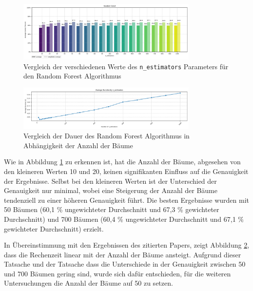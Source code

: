 \begin{figure}[H]
    \centering
    \includegraphics[width=0.8\textwidth]{images/04_random_forest_n_estimators_03.png}
    \caption{Vergleich der verschiedenen Werte des \texttt{n\_estimators} Parameters für den Random Forest Algorithmus}
    \label{fig:04_random_forest_n_estimators_03}
\end{figure}

\begin{figure}[H]
    \centering
    \includegraphics[width=0.8\textwidth]{images/04_random_forest_n_estimators_04.png}
    \caption{Vergleich der Dauer des Random Forest Algorithmus in Abhängigkeit der Anzahl der Bäume}
    \label{fig:04_random_forest_n_estimators_04}
\end{figure}

Wie in Abbildung \ref{fig:04_random_forest_n_estimators_03} zu erkennen ist, hat die Anzahl der Bäume, abgesehen von den kleineren Werten 10 und 20, keinen signifikanten Einfluss auf die Genauigkeit der Ergebnisse. Selbst bei den kleineren Werten ist der Unterschied der Genauigkeit nur minimal, wobei eine Steigerung der Anzahl der Bäume tendenziell zu einer höheren Genauigkeit führt. Die besten Ergebnisse wurden mit 50 Bäumen (60,1 \% ungewichteter Durchschnitt und 67,3 \% gewichteter Durchschnitt) und 700 Bäumen (60,4 \% ungewichteter Durchschnitt und 67,1 \% gewichteter Durchschnitt) erzielt.

In Übereinstimmung mit den Ergebnissen des zitierten Papers, zeigt Abbildung \ref{fig:04_random_forest_n_estimators_04}, dass die Rechenzeit linear mit der Anzahl der Bäume ansteigt. Aufgrund dieser Tatsache und der Tatsache dass die Unterschiede in der Genauigkeit zwischen 50 und 700 Bäumen gering sind, wurde sich dafür entschieden, für die weiteren Untersuchungen die Anzahl der Bäume auf 50 zu setzen.

